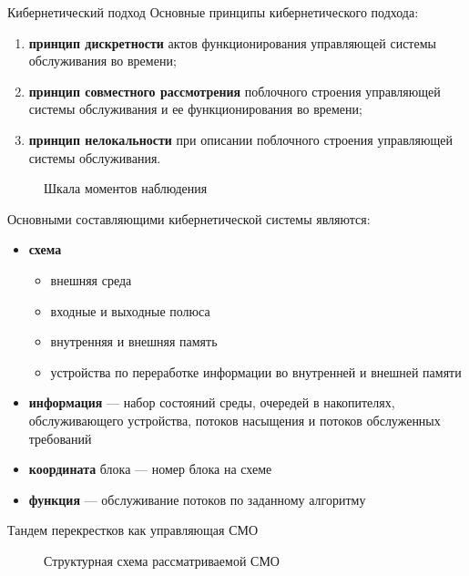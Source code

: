 \documentclass[10pt]{beamer}
\begin{document}
\begin{frame}[allowframebreaks]{Кибернетический подход}
Основные принципы кибернетического подхода:
  \begin{enumerate}
  \item \textbf{принцип дискретности} актов функционирования управляющей системы обслуживания во времени;
    \item \textbf{принцип совместного
    рассмотрения} поблочного строения управляющей системы
    обслуживания и ее функционирования во времени;
  \item \textbf{принцип нелокальности} при описании поблочного
    строения управляющей системы обслуживания.
  \end{enumerate}
  \framebreak
  
  
    \begin{figure}[h]
    \centering
    \caption{Шкала моментов наблюдения}
    \label{VK:fig:3}
  \end{figure}
 
  \framebreak
  
  
Основными составляющими кибернетической системы являются:
  \begin{itemize}
  \item \textbf{схема}
  \begin{itemize}
      \item внешняя среда
      \item входные и выходные полюса
      \item внутренняя и внешняя память
      \item устройства по переработке информации во внутренней и внешней памяти
      \end{itemize}
  \item \textbf{информация} --- набор состояний среды, очередей в накопителях, обслуживающего устройства, потоков насыщения и потоков обслуженных требований
  \item \textbf{координата} блока --- номер блока на схеме
  \item \textbf{функция} --- обслуживание потоков по заданному алгоритму
  \end{itemize}
\end{frame}


\begin{frame}{Тандем перекрестков как управляющая СМО}
  \begin{figure}[h]
    \centering
    \caption{Структурная схема рассматриваемой СМО}
    \label{VK:fig:2}
  \end{figure}
\end{frame} 
\end{document}
